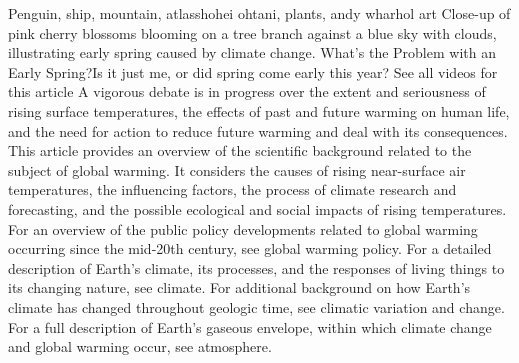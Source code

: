 Penguin, ship, mountain, atlasshohei ohtani, plants, andy wharhol art
Close-up of pink cherry blossoms blooming on a tree branch against a blue sky with clouds, illustrating early spring caused by climate change.
What's the Problem with an Early Spring?Is it just me, or did spring come early this year?
See all videos for this article
A vigorous debate is in progress over the extent and seriousness of rising surface temperatures, the effects of past and future warming on human life, and the need for action to reduce future warming and deal with its consequences. This article provides an overview of the scientific background related to the subject of global warming. It considers the causes of rising near-surface air temperatures, the influencing factors, the process of climate research and forecasting, and the possible ecological and social impacts of rising temperatures. For an overview of the public policy developments related to global warming occurring since the mid-20th century, see global warming policy. For a detailed description of Earth’s climate, its processes, and the responses of living things to its changing nature, see climate. For additional background on how Earth’s climate has changed throughout geologic time, see climatic variation and change. For a full description of Earth’s gaseous envelope, within which climate change and global warming occur, see atmosphere.